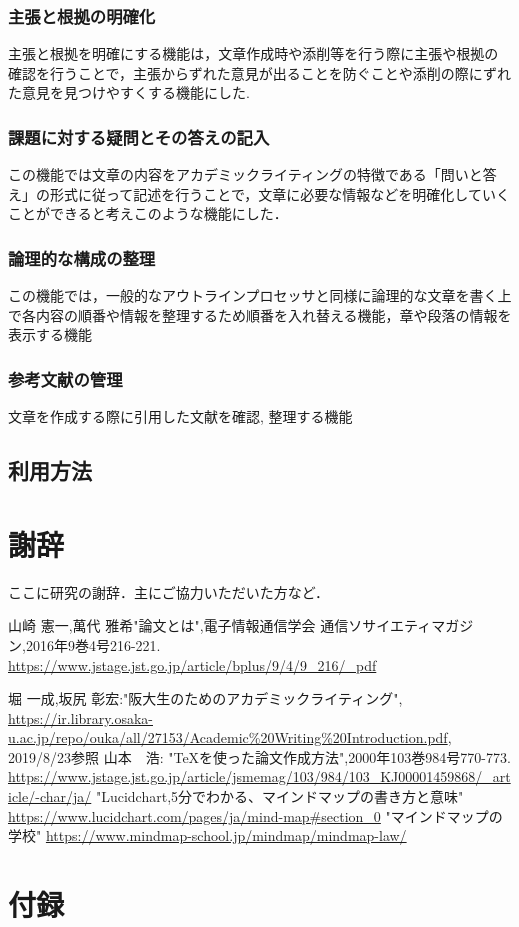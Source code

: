 \documentclass[a4j,12pt]{jarticle}
\begin{document}
\subsubsection{主張と根拠の明確化}
主張と根拠を明確にする機能は，文章作成時や添削等を行う際に主張や根拠の確認を行うことで，主張からずれた意見が出ることを防ぐことや添削の際にずれた意見を見つけやすくする機能にした.　
\subsubsection{課題に対する疑問とその答えの記入}
この機能では文章の内容をアカデミックライティングの特徴である「問いと答え」の形式に従って記述を行うことで，文章に必要な情報などを明確化していくことができると考えこのような機能にした．
\subsubsection{論理的な構成の整理}
この機能では，一般的なアウトラインプロセッサと同様に論理的な文章を書く上で各内容の順番や情報を整理するため順番を入れ替える機能，章や段落の情報を表示する機能
\subsubsection{参考文献の管理}
文章を作成する際に引用した文献を確認, 整理する機能
\subsection{利用方法}

\newpage

\section*{謝辞}

ここに研究の謝辞．主にご協力いただいた方など．

\newpage
{}
 \begin{thebibliography}{99}
山崎 憲一,萬代 雅希"論文とは",電子情報通信学会 通信ソサイエティマガジン,2016年9巻4号216-221.
\url{https://www.jstage.jst.go.jp/article/bplus/9/4/9_216/_pdf}

 堀 一成,坂尻 彰宏:"阪大生のためのアカデミックライティング",
\url{https://ir.library.osaka-u.ac.jp/repo/ouka/all/27153/Academic%20Writing%20Introduction.pdf}, 2019/8/23参照
 山本　浩: "TeXを使った論文作成方法",2000年103巻984号770-773.
\url{https://www.jstage.jst.go.jp/article/jsmemag/103/984/103_KJ00001459868/_article/-char/ja/}
 "Lucidchart,5分でわかる、マインドマップの書き方と意味"
\url{https://www.lucidchart.com/pages/ja/mind-map#section_0}
 "マインドマップの学校"
\url{https://www.mindmap-school.jp/mindmap/mindmap-law/}
\end{thebibliography}

\section*{付録}

\end{document}
